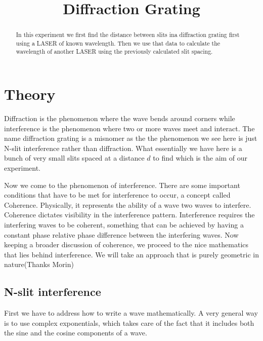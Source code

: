 \documentclass[a4paper]{article}
\title{Diffraction Grating}
\begin{document}
\maketitle
\renewcommand{\abstractname}{Aim}
\begin{abstract}
    In this experiment we first find the distance between slits ina diffraction grating first 
    using a LASER of known wavelength. Then we use that data to calculate the wavelength of 
    another LASER using the previously calculated slit spacing.
\end{abstract}
\section{Theory}
Diffraction is the phenomenon where the wave bends around corners 
while interference is the phenomenon where two or more waves meet and interact. 
The name diffraction grating is a misnomer as the the phenomenon we see here is 
just N-slit interference rather than diffraction. What essentially we have here is a bunch 
of very small slits spaced at a distance \(d\) to find  which is the aim of our experiment.

Now we come to the phenomenon of interference. There are some important conditions that have 
to be met for interference to occur, a concept called Coherence. Physically, it represents the 
ability of a wave two waves to interfere. Coherence dictates visibility in the interference 
pattern. Interference requires the interfering waves to be coherent, something that can be 
achieved by having a constant phase relative phase difference between the interfering waves. 
Now keeping a broader discussion of coherence, we proceed to the nice mathematics that lies
behind interference. We will take an approach that is purely geometric in nature(Thanks Morin)
\subsection{N-slit interference}
First we have to address how to write a wave mathematically. A very general way is to use 
complex exponentials, which takes care of the fact that it includes both the sine and the cosine
components of a wave. 
\end{document}
